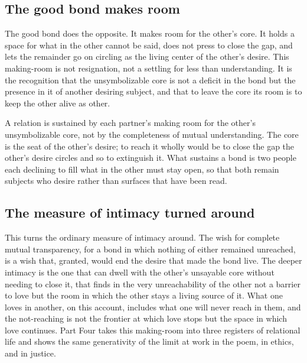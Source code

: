 \subsection*{The good bond makes room}

The good bond does the opposite. It makes room for the other's core. It holds a space for what in the other cannot be said, does not press to close the gap, and lets the remainder go on circling as the living center of the other's desire. This making-room is not resignation, not a settling for less than understanding. It is the recognition that the unsymbolizable core is not a deficit in the bond but the presence in it of another desiring subject, and that to leave the core its room is to keep the other alive as other.

\begin{claim}
A relation is sustained by each partner's making room for the other's unsymbolizable core, not by the completeness of mutual understanding. The core is the seat of the other's desire; to reach it wholly would be to close the gap the other's desire circles and so to extinguish it. What sustains a bond is two people each declining to fill what in the other must stay open, so that both remain subjects who desire rather than surfaces that have been read.
\end{claim}

\subsection*{The measure of intimacy turned around}

This turns the ordinary measure of intimacy around. The wish for complete mutual transparency, for a bond in which nothing of either remained unreached, is a wish that, granted, would end the desire that made the bond live. The deeper intimacy is the one that can dwell with the other's unsayable core without needing to close it, that finds in the very unreachability of the other not a barrier to love but the room in which the other stays a living source of it. What one loves in another, on this account, includes what one will never reach in them, and the not-reaching is not the frontier at which love stops but the space in which love continues. Part Four takes this making-room into three registers of relational life and shows the same generativity of the limit at work in the poem, in ethics, and in justice.
